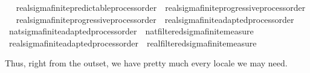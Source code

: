 \begin{isabellebody}
%
\endisatagproof
{\isafoldproof}%
%
\isadelimproof
%
\endisadelimproof
\ \isanewline
\isanewline
{}\isamarkupfalse%
\ real{\isacharunderscore}{\kern0pt}sigma{\isacharunderscore}{\kern0pt}finite{\isacharunderscore}{\kern0pt}predictable{\isacharunderscore}{\kern0pt}process{\isacharunderscore}{\kern0pt}order\ {\isasymsubseteq}\ real{\isacharunderscore}{\kern0pt}sigma{\isacharunderscore}{\kern0pt}finite{\isacharunderscore}{\kern0pt}progressive{\isacharunderscore}{\kern0pt}process{\isacharunderscore}{\kern0pt}order%
\isadelimproof
\ %
\endisadelimproof
%
\isatagproof
\isacommand{{\isachardot}{\kern0pt}{\isachardot}{\kern0pt}}\isamarkupfalse%
%
\endisatagproof
{\isafoldproof}%
%
\isadelimproof
%
\endisadelimproof
\isanewline
{}\isamarkupfalse%
\ real{\isacharunderscore}{\kern0pt}sigma{\isacharunderscore}{\kern0pt}finite{\isacharunderscore}{\kern0pt}progressive{\isacharunderscore}{\kern0pt}process{\isacharunderscore}{\kern0pt}order\ {\isasymsubseteq}\ real{\isacharunderscore}{\kern0pt}sigma{\isacharunderscore}{\kern0pt}finite{\isacharunderscore}{\kern0pt}adapted{\isacharunderscore}{\kern0pt}process{\isacharunderscore}{\kern0pt}order%
\isadelimproof
\ %
\endisadelimproof
%
\isatagproof
\isacommand{{\isachardot}{\kern0pt}{\isachardot}{\kern0pt}}\isamarkupfalse%
%
\endisatagproof
{\isafoldproof}%
%
\isadelimproof
%
\endisadelimproof
\isanewline
\isanewline
{}\isamarkupfalse%
\ nat{\isacharunderscore}{\kern0pt}sigma{\isacharunderscore}{\kern0pt}finite{\isacharunderscore}{\kern0pt}adapted{\isacharunderscore}{\kern0pt}process{\isacharunderscore}{\kern0pt}order\ {\isasymsubseteq}\ nat{\isacharunderscore}{\kern0pt}filtered{\isacharunderscore}{\kern0pt}sigma{\isacharunderscore}{\kern0pt}finite{\isacharunderscore}{\kern0pt}measure%
\isadelimproof
\ %
\endisadelimproof
%
\isatagproof
\isacommand{{\isachardot}{\kern0pt}{\isachardot}{\kern0pt}}\isamarkupfalse%
%
\endisatagproof
{\isafoldproof}%
%
\isadelimproof
%
\endisadelimproof
\isanewline
{}\isamarkupfalse%
\ real{\isacharunderscore}{\kern0pt}sigma{\isacharunderscore}{\kern0pt}finite{\isacharunderscore}{\kern0pt}adapted{\isacharunderscore}{\kern0pt}process{\isacharunderscore}{\kern0pt}order\ {\isasymsubseteq}\ real{\isacharunderscore}{\kern0pt}filtered{\isacharunderscore}{\kern0pt}sigma{\isacharunderscore}{\kern0pt}finite{\isacharunderscore}{\kern0pt}measure%
\isadelimproof
\ %
\endisadelimproof
%
\isatagproof
\isacommand{{\isachardot}{\kern0pt}{\isachardot}{\kern0pt}}\isamarkupfalse%
%
\endisatagproof
{\isafoldproof}%
%
\isadelimproof
%
\endisadelimproof
%
\begin{isamarkuptext}%
Thus, right from the outset, we have pretty much every locale we may need.%
\end{isamarkuptext}\isamarkuptrue%
%
\isadelimtheory
%
\endisadelimtheory
%
\isatagtheory
{}\isamarkupfalse%
%
\endisatagtheory
{\isafoldtheory}%
%
\isadelimtheory
%
\endisadelimtheory
%
\end{isabellebody}%
